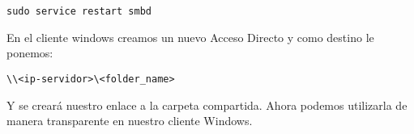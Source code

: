 \begin{lstlisting}
sudo service restart smbd
\end{lstlisting}

En el cliente windows creamos un nuevo Acceso Directo y como destino le ponemos:

\begin{lstlisting}
\\<ip-servidor>\<folder_name>
\end{lstlisting}

Y se creará nuestro enlace a la carpeta compartida. Ahora podemos utilizarla de manera transparente en nuestro cliente Windows.

\clearpage
\printbibliography



